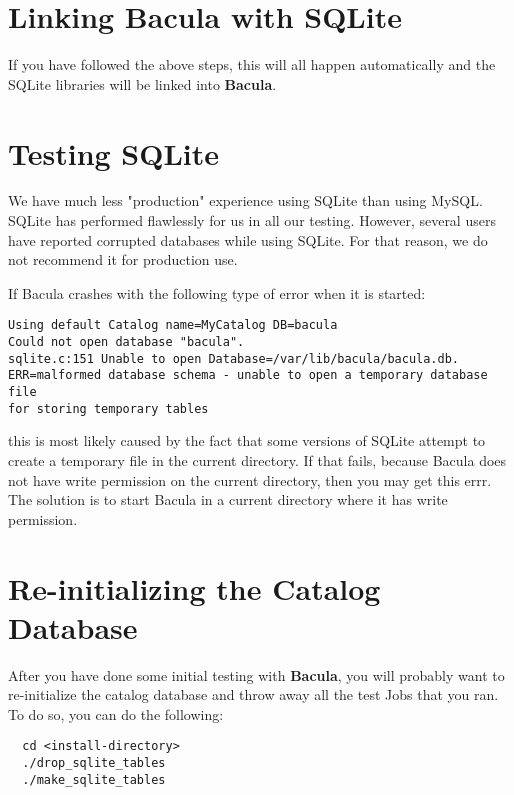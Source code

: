 \section{Linking Bacula with SQLite}

If you have followed the above steps, this will all happen automatically and
the SQLite libraries will be linked into {\bf Bacula}. 

\section{Testing SQLite}

We have much less "production" experience using SQLite than using MySQL.
SQLite has performed flawlessly for us in all our testing.  However,
several users have reported corrupted databases while using SQLite.  For
that reason, we do not recommend it for production use.

If Bacula crashes with the following type of error when it is started:
\footnotesize
\begin{verbatim}
Using default Catalog name=MyCatalog DB=bacula
Could not open database "bacula".
sqlite.c:151 Unable to open Database=/var/lib/bacula/bacula.db.
ERR=malformed database schema - unable to open a temporary database file
for storing temporary tables
\end{verbatim}
\normalsize

this is most likely caused by the fact that some versions of
SQLite attempt to create a temporary file in the current directory.
If that fails, because Bacula does not have write permission on
the current directory, then you may get this errr.  The solution is
to start Bacula in a current directory where it has write permission.


\section{Re-initializing the Catalog Database}

After you have done some initial testing with {\bf Bacula}, you will probably
want to re-initialize the catalog database and throw away all the test Jobs
that you ran. To do so, you can do the following: 

\footnotesize
\begin{verbatim}
  cd <install-directory>
  ./drop_sqlite_tables
  ./make_sqlite_tables
\end{verbatim}
\normalsize


